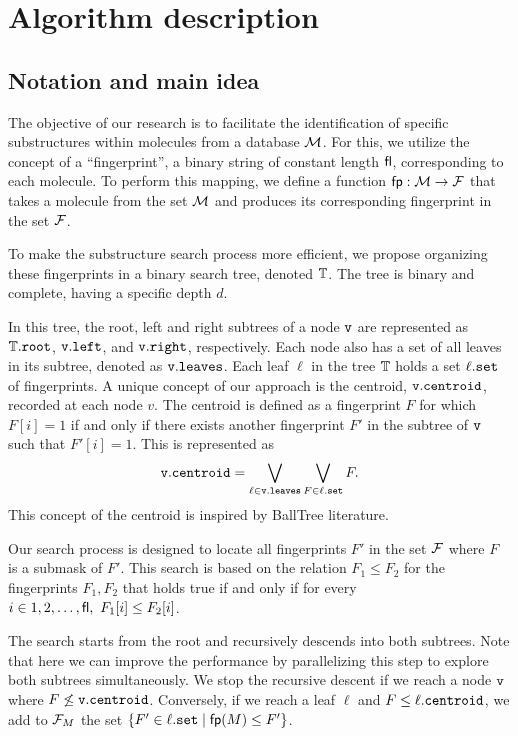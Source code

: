 \section{Algorithm description}

\subsection{Notation and main idea}
The objective of our research is to facilitate the identification of specific substructures within molecules from a database $\mathcal{M}$. 
For this, we utilize the concept of a ``fingerprint'', a binary string of constant length ${\sf fl}$, corresponding to each molecule. 
To perform this mapping, we define a function ${\sf fp}: \mathcal{M} \to \mathcal{F}$ that takes a molecule from the set $\mathcal{M}$ and produces its 
corresponding fingerprint in the set $\mathcal{F}$. 

To make the substructure search process more efficient, we propose organizing these fingerprints in a binary search tree, denoted $\mathbb{T}$. 
The tree is binary and complete, having a specific depth $d$.

In this tree, the root, left and right subtrees of a node $\tt{v}$ are represented as $\mathbb{T}.\tt{root}$, $\tt{v.left}$, and $\tt{v.right}$, 
respectively. Each node also has a set of all leaves in its subtree, denoted as $\tt{v.leaves}$. Each leaf $\ell$ in the tree $\mathbb{T}$ holds 
a set $\ell.\tt{set}$ of fingerprints. A unique concept of our approach is the centroid, ${\tt v.centroid}$, recorded at each node $v$. 
The centroid is defined as a fingerprint $F$ for which $F[i] = 1$ if and only if there exists another fingerprint $F'$ in the subtree 
of $\tt{v}$ such that $F'[i] = 1$. This is represented as
$${\tt v.centroid} = \bigvee\limits_{\ell \in {\tt v.leaves}}\bigvee\limits_{F \in \ell.{\tt set}} F.$$ 
This concept of the centroid is inspired by BallTree literature.

Our search process is designed to locate all fingerprints $F'$ in the set $\mathcal{F}$ where $F$ is a submask of $F'$. This search is based on the 
relation $F_1 \le F_2$ for the fingerprints $F_1, F_2$ that holds true if and only if for every $i \in {1, 2, \ldots, {\sf fl}}, \ F_1[i] \le F_2[i]$. 

The search starts from the root and recursively descends into both subtrees. Note that here we can improve the performance by parallelizing 
this step to explore both subtrees simultaneously. We stop the recursive descent if we reach a node ${\tt v}$ where $F \not\le {\tt v.centroid}$. 
Conversely, if we reach a leaf $\ell$ and $F \le \ell.{\tt centroid}$, we add to $\mathcal{F}_M$ the set $\{F' \in  \ell.{\tt set} \mid {\sf fp}(M) \le F'\}$.

